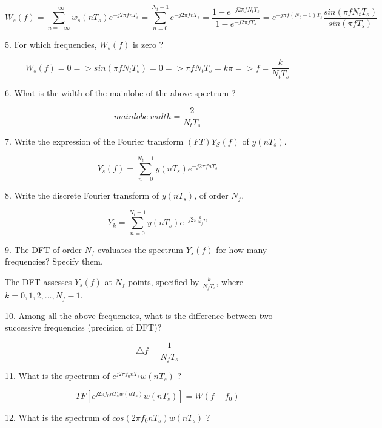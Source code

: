 \documentclass{article}
\begin{document}
\begin{equation}
    W_s(f) 
    = \sum_{n=-\infty}^{+\infty}w_s(nT_s)e^{-j2\pi fnT_s}
    = \sum_{n=0}^{N_t-1}e^{-j2\pi fnT_s}
    = \frac{1-e^{-j2\pi fN_tT_s}}{1-e^{-j2\pi fT_s}}
    = e^{-j\pi f(N_t-1)T_s}\frac{sin(\pi fN_tT_s)}{sin(\pi fT_s)}
\end{equation}

5. For which frequencies, $W_s(f)$ is zero ?

\begin{equation}
    W_s(f) = 0 => sin(\pi fN_tT_s)=0 => \pi fN_tT_s=k\pi => f=\frac{k}{N_tT_s}
\end{equation}

6. What is the width of the mainlobe of the above spectrum ? 

\begin{equation}
    mainlobe~width = \frac{2}{N_tT_s}
\end{equation}

7. Write the expression of the Fourier transform $(FT)Y_S(f)$ of $y(nT_s)$.

\begin{equation}
    Y_s(f) = \sum_{n=0}^{N_t-1}y(nT_s)e^{-j2\pi fnT_s}
\end{equation}

8. Write the discrete Fourier transform of $y(nT_s)$, of order $N_f$.

\begin{equation}
    Y_k = \sum_{n=0}^{N_t-1}y(nT_s)e^{-j2\pi \frac{k}{N_f}n}
\end{equation}

9. The DFT of order $N_f$ evaluates the spectrum $Y_s(f)$ for how many frequencies? Specify them.

The DFT assesses $Y_s(f)$ at $N_f$ points, specified by
$\frac{k}{N_fT_s}$, where $k=0,1,2,\ldots,N_f-1$.

10. Among all the above frequencies, what is the difference between two successive frequencies (precision of DFT)? 

\begin{equation}
    \triangle f = \frac{1}{N_fT_s}
\end{equation}

11. What is the spectrum of $e^{j2\pi f_0nT_s}w(nT_s)$ ?

\begin{equation}
    TF[e^{j2\pi f_0nT_sw(nT_s)}w(nT_s)] = W(f-f_0)
\end{equation}

12. What is the spectrum of $cos(2\pi f_0nT_s)w(nT_s)$ ?
\end{document}
